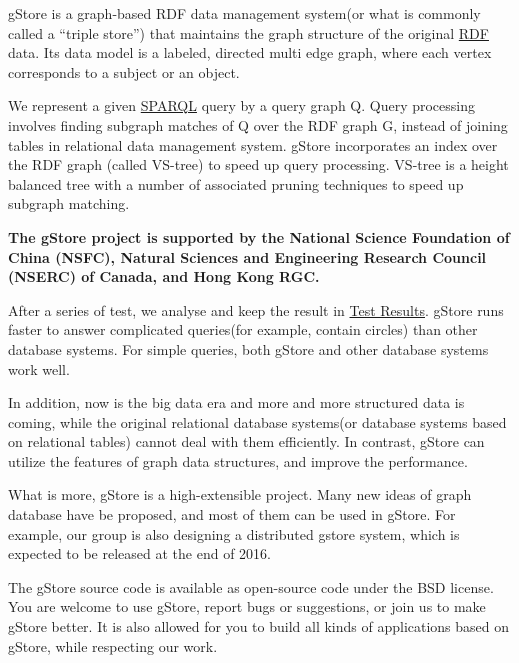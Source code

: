 \documentclass[titlepage, a4paper, 12pt]{article}
\begin{document}
gStore is a graph-based RDF data management system(or what is commonly called a ``triple store'') that maintains the graph structure of the original \href{http://www.w3.org/TR/rdf11-concepts/}{RDF} data. Its data model is a labeled, directed multi edge graph, where each vertex corresponds to a subject or an object.

We represent a given \href{http://www.w3.org/TR/sparql11-overview/}{SPARQL} query by a query graph Q. Query processing involves finding subgraph matches of Q over the RDF graph G, instead of joining tables in relational data management system. gStore incorporates an index over the RDF graph (called VS-tree) to speed up query processing. VS-tree is a height balanced tree with a number of associated pruning techniques to speed up subgraph matching.

\textbf{The gStore project is supported by the National Science Foundation of China (NSFC), Natural Sciences and Engineering Research Council (NSERC) of Canada, and Hong Kong RGC.}


After a series of test, we analyse and keep the result in \hyperref[chapter14]{Test Results}. gStore runs faster to answer complicated queries(for example, contain circles) than other database systems. For simple queries, both gStore and other database systems work
well.

In addition, now is the big data era and more and more structured data is coming, while the original relational database systems(or database systems based on relational tables) cannot deal with them efficiently.  In contrast, gStore can utilize the features of graph data structures, and improve the performance.

What is more, gStore is a high-extensible project. Many new ideas of graph database have be proposed, and most of them can be used in gStore.  For example, our group is also designing a distributed gstore system, which is expected to be released at the end of 2016.


The gStore source code is available as open-source code under the BSD license. You are welcome to use gStore, report bugs or suggestions, or join us to make gStore better. It is also allowed for you to build all kinds of applications based on gStore, while respecting our work.
\end{document}
